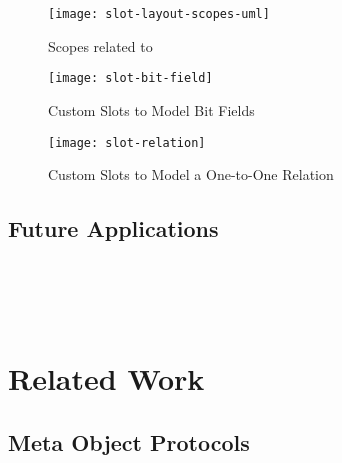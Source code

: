 \begin{figure}[h]
	\centering
	\texttt{[image: slot-layout-scopes-uml]}
	\caption{Scopes related to }
\end{figure}


\begin{figure}[h]
	\centering
	\texttt{[image: slot-bit-field]}
	\caption{Custom Slots to Model Bit Fields}
\end{figure}


\begin{figure}[h]
	\centering
	\texttt{[image: slot-relation]}
	\caption{Custom Slots to Model a One-to-One Relation}
\end{figure}

\subsection{Future Applications}
 \\
 \\
 \\

\section{Related Work}

\subsection{Meta Object Protocols}
 \\
 \\
 \\


